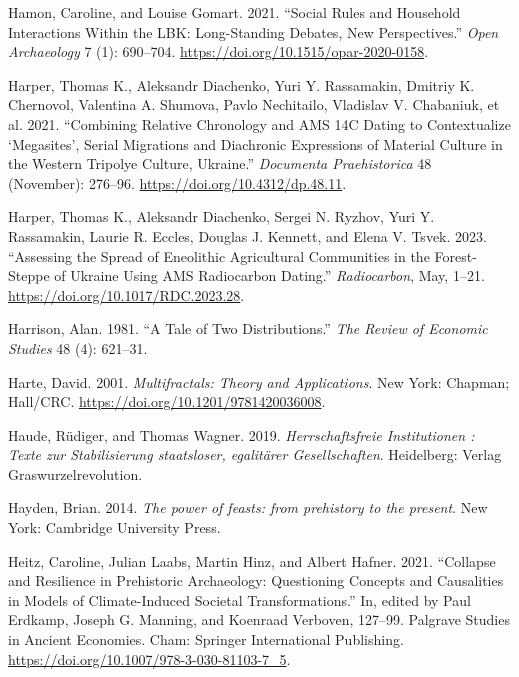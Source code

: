\documentclass[
  12pt,
  a4paper, twoside]{book}
\newlength{\cslhangindent}
\newlength{\cslentryspacingunit} %
\newenvironment{CSLReferences}[2] %
 {%
  \setlength{\parindent}{0pt}
  \ifodd #1
  \let\oldpar\par
  \def\par{\hangindent=\cslhangindent\oldpar}
  \fi
  \setlength{\parskip}{#2\cslentryspacingunit}
 }%
 {}
\begin{document}
\begin{CSLReferences}{1}{0}
\leavevmode{}%
Hamon, Caroline, and Louise Gomart. 2021. {``Social Rules and Household Interactions Within the LBK: Long-Standing Debates, New Perspectives.''} \emph{Open Archaeology} 7 (1): 690--704. \url{https://doi.org/10.1515/opar-2020-0158}.

\leavevmode{}%
Harper, Thomas K., Aleksandr Diachenko, Yuri Y. Rassamakin, Dmitriy K. Chernovol, Valentina A. Shumova, Pavlo Nechitailo, Vladislav V. Chabaniuk, et al. 2021. {``Combining Relative Chronology and AMS 14C Dating to Contextualize {`}Megasites{'}, Serial Migrations and Diachronic Expressions of Material Culture in the Western Tripolye Culture, Ukraine.''} \emph{Documenta Praehistorica} 48 (November): 276--96. \url{https://doi.org/10.4312/dp.48.11}.

\leavevmode{}%
Harper, Thomas K., Aleksandr Diachenko, Sergei N. Ryzhov, Yuri Y. Rassamakin, Laurie R. Eccles, Douglas J. Kennett, and Elena V. Tsvek. 2023. {``Assessing the Spread of Eneolithic Agricultural Communities in the Forest-Steppe of Ukraine Using AMS Radiocarbon Dating.''} \emph{Radiocarbon}, May, 1--21. \url{https://doi.org/10.1017/RDC.2023.28}.

\leavevmode{}%
Harrison, Alan. 1981. {``A Tale of Two Distributions.''} \emph{The Review of Economic Studies} 48 (4): 621--31.

\leavevmode{}%
Harte, David. 2001. \emph{Multifractals: Theory and Applications}. New York: Chapman; Hall/CRC. \url{https://doi.org/10.1201/9781420036008}.

\leavevmode{}%
Haude, Rüdiger, and Thomas Wagner. 2019. \emph{Herrschaftsfreie Institutionen : Texte zur Stabilisierung staatsloser, egalitärer Gesellschaften}. Heidelberg: Verlag Graswurzelrevolution.

\leavevmode{}%
Hayden, Brian. 2014. \emph{The power of feasts: from prehistory to the present}. New York: Cambridge University Press.

\leavevmode{}%
Heitz, Caroline, Julian Laabs, Martin Hinz, and Albert Hafner. 2021. {``Collapse and Resilience in Prehistoric Archaeology: Questioning Concepts and Causalities in Models of Climate-Induced Societal Transformations.''} In, edited by Paul Erdkamp, Joseph G. Manning, and Koenraad Verboven, 127--99. Palgrave Studies in Ancient Economies. Cham: Springer International Publishing. \url{https://doi.org/10.1007/978-3-030-81103-7_5}.


\end{CSLReferences}
\end{document}
